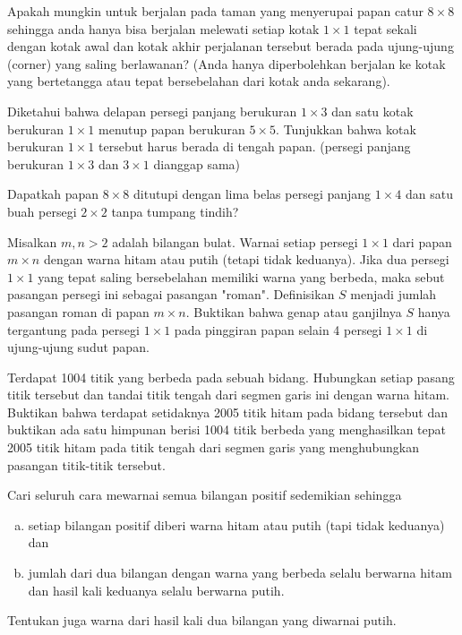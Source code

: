 \documentclass[12pt]{scrartcl}
\begin{document}
\begin{soaljawab}
    Apakah mungkin untuk berjalan pada taman yang menyerupai papan catur $8 \times 8$ sehingga anda hanya bisa berjalan melewati setiap kotak $1 \times 1$ tepat sekali dengan kotak awal dan kotak akhir perjalanan tersebut berada pada ujung-ujung (corner) yang saling berlawanan? (Anda hanya diperbolehkan berjalan ke kotak yang bertetangga atau tepat bersebelahan dari kotak anda sekarang).
\end{soaljawab}

\begin{soaljawab}
    Diketahui bahwa delapan persegi panjang berukuran $1 \times 3$ dan satu kotak berukuran $1 \times 1$ menutup papan berukuran $5 \times 5$. Tunjukkan bahwa kotak berukuran $1 \times 1$ tersebut harus berada di tengah papan. (persegi panjang berukuran $1 \times 3$ dan $3 \times 1$ dianggap sama)
\end{soaljawab}

\begin{soaljawab}
    Dapatkah papan $8\times8$ ditutupi dengan lima belas persegi panjang $1\times4$ dan satu buah persegi $2\times2$ tanpa tumpang tindih?
\end{soaljawab}

\begin{soaljawab}
    Misalkan $m,n > 2$ adalah bilangan bulat. Warnai setiap persegi $1\times1$ dari papan $m\times n$ dengan warna hitam atau putih (tetapi tidak keduanya). Jika dua persegi $1\times1$ yang tepat saling bersebelahan memiliki warna yang berbeda, maka sebut pasangan persegi ini sebagai pasangan "roman". Definisikan $S$ menjadi jumlah pasangan roman di papan $m\times n$. Buktikan bahwa genap atau ganjilnya $S$ hanya tergantung pada persegi $1\times1$ pada pinggiran papan selain 4 persegi $1\times1$ di ujung-ujung sudut papan.
\end{soaljawab}

\begin{soaljawab}
    Terdapat 1004 titik yang berbeda pada sebuah bidang. Hubungkan setiap pasang titik tersebut dan tandai titik tengah dari segmen garis ini dengan warna hitam. Buktikan bahwa terdapat setidaknya 2005 titik hitam pada bidang tersebut dan buktikan ada satu himpunan berisi 1004 titik berbeda yang menghasilkan tepat 2005 titik hitam pada titik tengah dari segmen garis yang menghubungkan pasangan titik-titik tersebut.
\end{soaljawab}

\begin{soaljawab}
    Cari seluruh cara mewarnai semua bilangan positif sedemikian sehingga 
    \begin{enumerate}[(a)]
        \item setiap bilangan positif diberi warna hitam atau putih (tapi tidak keduanya) dan \item jumlah dari dua bilangan dengan warna yang berbeda selalu berwarna hitam dan hasil kali keduanya selalu berwarna putih.
    \end{enumerate}
     
    Tentukan juga warna dari hasil kali dua bilangan yang diwarnai putih.
\end{soaljawab}
\end{document}
